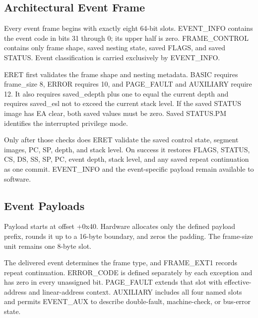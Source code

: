 \clearpage
\subsection{Architectural Event Frame}
Every event frame begins with exactly eight 64-bit slots. EVENT\_INFO contains the event code in bits 31 through 0;
its upper half is zero. FRAME\_CONTROL contains only frame shape, saved nesting state, saved FLAGS, and saved STATUS.
Event classification is carried exclusively by EVENT\_INFO.









ERET first validates the frame shape and nesting metadata. BASIC requires frame\_size 8, ERROR requires 10, and
PAGE\_FAULT and AUXILIARY require 12. It also requires saved\_edepth plus one to equal the current depth and requires
saved\_esl not to exceed the current stack level. If the saved STATUS image has EA clear, both saved values must be
zero. Saved STATUS.PM identifies the interrupted privilege mode.

Only after those checks does ERET validate the saved control state, segment images, PC, SP, depth, and stack level.
On success it restores FLAGS, STATUS, CS, DS, SS, SP, PC, event depth, stack level, and any saved repeat continuation
as one commit. EVENT\_INFO and the event-specific payload remain available to software.

\subsection{Event Payloads}
Payload starts at offset +0x40. Hardware allocates only the defined payload prefix, rounds it up to a 16-byte
boundary, and zeros the padding. The frame-size unit remains one 8-byte slot.



The delivered event determines the frame type, and FRAME\_EXT1 records repeat continuation. ERROR\_CODE is defined
separately by each exception and has zero in every unassigned bit. PAGE\_FAULT extends that slot with
effective-address and linear-address context. AUXILIARY includes all four named slots and permits EVENT\_AUX to
describe double-fault, machine-check, or bus-error state.

